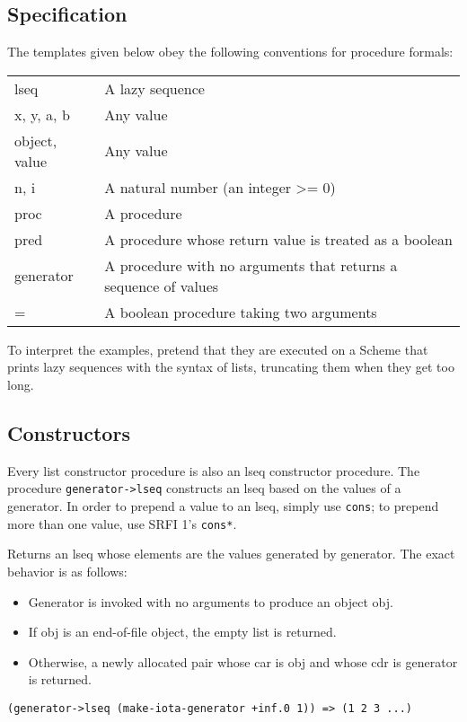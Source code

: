 \subsection{{Specification}}\label{specification}

The templates given below obey the following conventions for procedure
formals:

\begin{tabular}{ll}
lseq & A lazy sequence\\
x, y, a, b & Any value\\
object, value & Any value\\
n, i & A natural number (an integer >= 0)\\
proc & A procedure\\
pred & A procedure whose return value is treated as a
boolean\\
generator & A procedure with no arguments that returns a sequence of
values\\
= & A boolean procedure taking two arguments\\
\end{tabular}

To interpret the examples, pretend that they are executed on a Scheme
that prints lazy sequences with the syntax of lists, truncating them
when they get too long.

\subsection{{Constructors}}\label{constructors}

Every list constructor procedure is also an lseq constructor procedure.
The procedure \texttt{generator->lseq} constructs an lseq
based on the values of a generator. In order to prepend a value to an
lseq, simply use \texttt{cons}; to prepend more than one value, use SRFI
1's \texttt{cons*}.

\begin{entry}{%
  }

  Returns an lseq whose elements are the values generated by
  generator.  The exact behavior is as follows:

\begin{itemize}
  \tightlist
\item Generator is invoked with no arguments to produce an object obj.
\item If obj is an end-of-file object, the empty list is returned.
\item Otherwise, a newly allocated pair whose car is obj and whose cdr
  is generator is returned.
\end{itemize}

\begin{verbatim}
(generator->lseq (make-iota-generator +inf.0 1)) => (1 2 3 ...)
\end{verbatim}
\end{entry}
